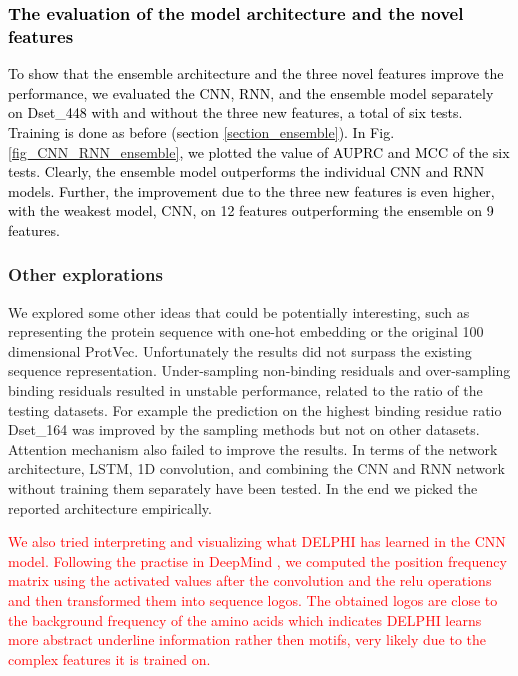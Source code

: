 \documentclass{bioinfo}
\newcommand{\myColor}{black}
\newcommand{\mythirdColor}{red}
\begin{document}
\textcolor{\myColor}{
\subsubsection{The evaluation of the model architecture and the novel features}
To show that the ensemble architecture and the three novel features improve the performance, we evaluated the CNN, RNN, and the ensemble model separately on Dset\_448 with and without the three new features, a total of six tests. Training is done as before (section \ref{section_ensemble}). In Fig. \ref{fig_CNN_RNN_ensemble}, we plotted the value of AUPRC and MCC of the six tests. Clearly, the ensemble model outperforms the individual CNN and RNN models. Further, the improvement due to the three new features is even higher, with the weakest model, CNN, on 12 features outperforming the ensemble on 9 features. }

\subsubsection{Other explorations}
We explored some other ideas that could be potentially interesting, such as representing the protein sequence with one-hot embedding or the original 100 dimensional ProtVec. Unfortunately the results did not surpass the existing sequence representation. Under-sampling non-binding residuals and over-sampling binding residuals resulted in unstable performance, related to the ratio of the testing datasets. For example the prediction on the highest binding residue ratio Dset\_164 was improved by the sampling methods but not on other datasets. Attention mechanism also failed to improve the results. In terms of the network architecture, LSTM, 1D convolution, and combining the CNN and RNN network without training them separately have been tested. In the end we picked the reported architecture empirically. 

\textcolor{\mythirdColor}{We also tried interpreting and visualizing what DELPHI has learned in the CNN model. Following the practise in DeepMind \citep{alipanahi2015predicting}, we computed the position frequency matrix using the activated values after the convolution and the relu operations and then transformed them into sequence logos. The obtained logos are close to the background frequency of the amino acids which indicates DELPHI learns more abstract underline information rather then motifs, very likely due to the complex features it is trained on.} 
\end{document}
